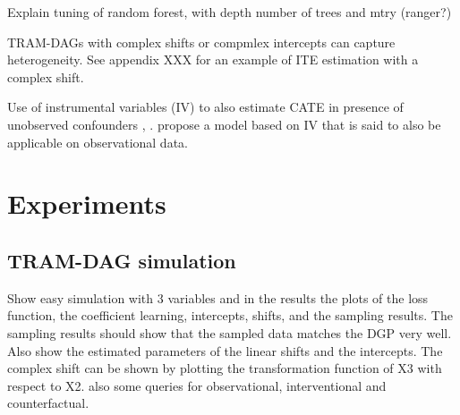 Explain tuning of random forest, with depth number of trees and mtry (ranger?)


TRAM-DAGs with complex shifts or compmlex intercepts can capture heterogeneity. See appendix XXX for an example of ITE estimation with a complex shift.

Use of instrumental variables (IV) to also estimate CATE in presence of unobserved confounders \citep{nichols2007}, \citep{hartford2017}. \citet{frauen2023} propose a model based on IV that is said to also be applicable on observational data. %








\section{Experiments}

\subsection{TRAM-DAG simulation}

Show easy simulation with 3 variables and in the results the plots of the loss function, the coefficient learning, intercepts, shifts, and the sampling results. The sampling results should show that the sampled data matches the DGP very well. Also show the estimated parameters of the linear shifts and the intercepts. The complex shift can be shown by plotting the transformation function of X3 with respect to X2. also some queries for observational, interventional and counterfactual.

